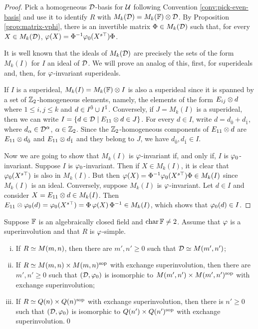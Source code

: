 \begin{proof}
    Pick a homogeneous $\mathcal{D}$-basis for $\mathcal U$ following Convention \ref{conv:pick-even-basis} and use it to identify $R$ with $M_k(\mathcal{D}) = M_k(\mathbb{F}) \otimes \mathcal{D}$. 
    By Proposition \ref{prop:matrix-vphi}, there is an invertible matrix $\Phi \in M_k(\mathcal{D})$ such that, for every $X \in M_k(\mathcal{D})$,
    $\varphi(X) = \Phi^{-1} \varphi_0(X^{s\top}) \Phi$.
    
    It is well known that the ideals of $M_k(\mathcal{D})$ are precisely the sets of the form $M_k(I)$ for $I$ an ideal of $\mathcal{D}$. 
    We will prove an analog of this, first, for superideals and, then, for $\varphi$-invariant superideals.
    
    If $I$ is a superideal, $M_k(I) = M_k(\mathbb{F}) \otimes I$ is also a superideal since it is spanned by a set of $\mathbb{Z}_2$-homogeneous elements, namely, the elements of the form $E_{ij}\otimes d$ where $1 \leq i,j \leq k$ and $d \in I^{\bar0} \cup I^{\bar1}$. 
    Conversely, if $J = M_k(I)$ is a superideal, then we can write $I = \{ d\in  \mathcal{D} \mid E_{11}\otimes d \in J\}$. 
    For every $d\in I$, write $d = d_{\bar 0} + d_{\bar 1}$, where $d_\alpha \in \mathcal{D}^\alpha$, $\alpha \in \mathbb{Z}_2$. 
    Since the $\mathbb{Z}_2$-homogeneous components of $E_{11}\otimes d$ are $E_{11}\otimes d_{\bar 0}$ and $E_{11}\otimes d_{\bar 1}$ and they belong to $J$, we have $d_{\bar 0}, d_{\bar 1} \in I$.
    
    Now we are going to show that $M_k(I)$ is $\varphi$-invariant if, and only if, $I$ is $\varphi_0$-invariant. 
    Suppose $I$ is $\varphi_0$-invariant.
    Then if $X \in M_k(I)$, it is clear that $\varphi_0 (X^{s\top})$ is also in $M_k(I)$. 
    But then $\varphi(X) = \Phi^{-1} \varphi_0(X^{s\top}) \Phi \in M_k(I)$ since $M_k(I)$ is an ideal. 
    Conversely, suppose $M_k(I)$ is $\varphi$-invariant. 
    Let $d \in I$ and consider $X = E_{11} \otimes d \in M_k(I)$.
    Then $E_{11} \otimes \varphi_0(d) = \varphi_0(X^{s\top}) = \Phi\, \varphi(X)\, \Phi^{-1} \in M_k(I)$, which shows that $\varphi_0(d) \in I$.
\end{proof}

\begin{cor}\label{cor:D-has-the-same-type}
    Suppose $\mathbb{F}$ is an algebraically closed field and $\operatorname{char} \mathbb{F} \neq 2$. 
    Assume that $\varphi$ is a superinvolution and that $R$ is $\varphi$-simple.
     \begin{enumerate}[(i)]
        \item If $R\simeq M(m,n)$, then there are $m', n'\geq 0$ such that $\mathcal{D} \simeq M(m', n')$;
        \item If $R\simeq M(m,n)\times M(m,n)^{\mathrm{sop}}$ with exchange superinvolution, then there are $m', n'\geq 0$ such that $(\mathcal{D}, \varphi_0)$ is isomorphic to $M(m', n')\times M(m', n')^{\mathrm{sop}}$ with exchange superinvolution;
        \item If $R\simeq Q(n)\times Q(n)^{\mathrm{sop}}$ with exchange superinvolution, then there is $n' \geq 0$ such that $(\mathcal{D}, \varphi_0)$ is isomorphic to $Q(n')\times Q(n')^{\mathrm{sop}}$ with exchange superinvolution.\qed
    \end{enumerate}
\end{cor}

